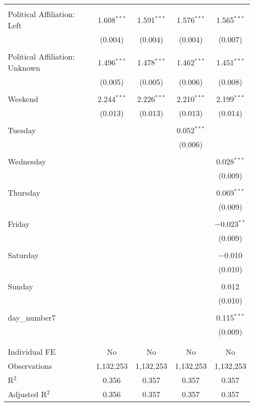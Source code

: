 \documentclass[
]{article}
\begin{document}
\begin{table}[!htbp]
{\begin{tabular}{@{\extracolsep{5pt}}lcccc}
  & & & & \\ 
 Political Affiliation: Left & 1.608$^{***}$ & 1.591$^{***}$ & 1.576$^{***}$ & 1.565$^{***}$ \\ 
  & (0.004) & (0.004) & (0.004) & (0.007) \\ 
  & & & & \\ 
 Political Affiliation: Unknown & 1.496$^{***}$ & 1.478$^{***}$ & 1.462$^{***}$ & 1.451$^{***}$ \\ 
  & (0.005) & (0.005) & (0.006) & (0.008) \\ 
  & & & & \\ 
 Weekend & 2.244$^{***}$ & 2.226$^{***}$ & 2.210$^{***}$ & 2.199$^{***}$ \\ 
  & (0.013) & (0.013) & (0.013) & (0.014) \\ 
  & & & & \\ 
 Tuesday &  &  & 0.052$^{***}$ &  \\ 
  &  &  & (0.006) &  \\ 
  & & & & \\ 
 Wednesday &  &  &  & 0.028$^{***}$ \\ 
  &  &  &  & (0.009) \\ 
  & & & & \\ 
 Thursday &  &  &  & 0.069$^{***}$ \\ 
  &  &  &  & (0.009) \\ 
  & & & & \\ 
 Friday &  &  &  & $-$0.023$^{**}$ \\ 
  &  &  &  & (0.009) \\ 
  & & & & \\ 
 Saturday &  &  &  & $-$0.010 \\ 
  &  &  &  & (0.010) \\ 
  & & & & \\ 
 Sunday &  &  &  & 0.012 \\ 
  &  &  &  & (0.010) \\ 
  & & & & \\ 
 day\_number7 &  &  &  & 0.115$^{***}$ \\ 
  &  &  &  & (0.009) \\ 
  & & & & \\ 
\hline \\[-1.8ex] 
Individual FE & No & No & No & No \\ 
Observations & 1,132,253 & 1,132,253 & 1,132,253 & 1,132,253 \\ 
R$^{2}$ & 0.356 & 0.357 & 0.357 & 0.357 \\ 
Adjusted R$^{2}$ & 0.356 & 0.357 & 0.357 & 0.357 \\ 

\end{tabular}}
\end{table}
\end{document}

